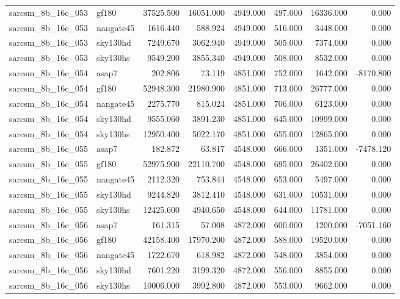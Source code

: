 \begin{tabular}{llrrrrrr}
sarcsm\_8b\_16c\_053 & gf180 & 37525.500 & 16051.000 & 4949.000 & 497.000 & 16336.000 & 0.000 \\
sarcsm\_8b\_16c\_053 & nangate45 & 1616.440 & 588.924 & 4949.000 & 516.000 & 3448.000 & 0.000 \\
sarcsm\_8b\_16c\_053 & sky130hd & 7249.670 & 3062.940 & 4949.000 & 505.000 & 7374.000 & 0.000 \\
sarcsm\_8b\_16c\_053 & sky130hs & 9549.200 & 3855.340 & 4949.000 & 508.000 & 8532.000 & 0.000 \\
sarcsm\_8b\_16c\_054 & asap7 & 202.806 & 73.119 & 4851.000 & 752.000 & 1642.000 & -8170.800 \\
sarcsm\_8b\_16c\_054 & gf180 & 52948.300 & 21980.900 & 4851.000 & 713.000 & 26777.000 & 0.000 \\
sarcsm\_8b\_16c\_054 & nangate45 & 2275.770 & 815.024 & 4851.000 & 706.000 & 6123.000 & 0.000 \\
sarcsm\_8b\_16c\_054 & sky130hd & 9555.060 & 3891.230 & 4851.000 & 645.000 & 10999.000 & 0.000 \\
sarcsm\_8b\_16c\_054 & sky130hs & 12950.400 & 5022.170 & 4851.000 & 655.000 & 12865.000 & 0.000 \\
sarcsm\_8b\_16c\_055 & asap7 & 182.872 & 63.817 & 4548.000 & 666.000 & 1351.000 & -7478.120 \\
sarcsm\_8b\_16c\_055 & gf180 & 52975.900 & 22110.700 & 4548.000 & 695.000 & 26402.000 & 0.000 \\
sarcsm\_8b\_16c\_055 & nangate45 & 2112.320 & 753.844 & 4548.000 & 653.000 & 5497.000 & 0.000 \\
sarcsm\_8b\_16c\_055 & sky130hd & 9244.820 & 3812.410 & 4548.000 & 631.000 & 10531.000 & 0.000 \\
sarcsm\_8b\_16c\_055 & sky130hs & 12425.600 & 4940.650 & 4548.000 & 644.000 & 11781.000 & 0.000 \\
sarcsm\_8b\_16c\_056 & asap7 & 161.315 & 57.008 & 4872.000 & 600.000 & 1200.000 & -7051.160 \\
sarcsm\_8b\_16c\_056 & gf180 & 42158.400 & 17970.200 & 4872.000 & 588.000 & 19520.000 & 0.000 \\
sarcsm\_8b\_16c\_056 & nangate45 & 1722.670 & 618.982 & 4872.000 & 548.000 & 3854.000 & 0.000 \\
sarcsm\_8b\_16c\_056 & sky130hd & 7601.220 & 3199.320 & 4872.000 & 556.000 & 8855.000 & 0.000 \\
sarcsm\_8b\_16c\_056 & sky130hs & 10006.000 & 3992.800 & 4872.000 & 553.000 & 9662.000 & 0.000 \\

\end{tabular}
